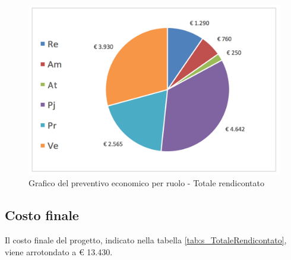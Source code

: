 			\begin{figure}[H]
			\centering
			\includegraphics[scale=0.40]{img/s_TotaleRendicontato}
			\caption{Grafico del preventivo economico per ruolo - Totale rendicontato}
			\label{fig:Totale rendicontato economico"}
			\end{figure}
\subsection{Costo finale}
Il costo finale del progetto, indicato nella tabella \ref{tab:s_TotaleRendicontato}, viene arrotondato a € 13.430.
